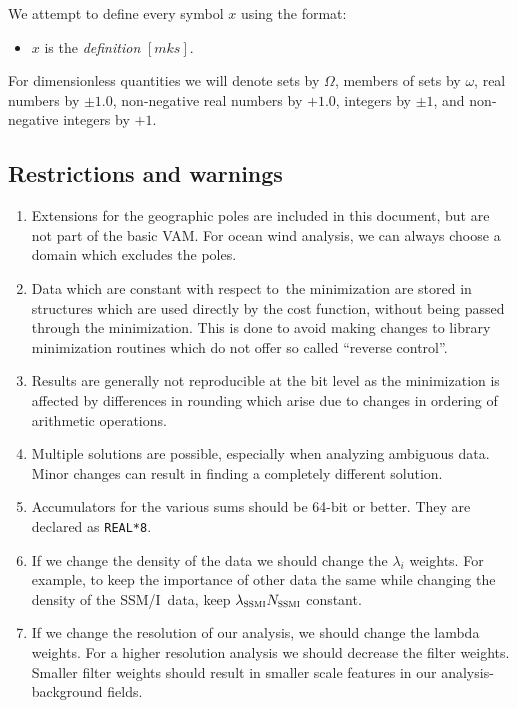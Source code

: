 \documentclass[11pt]{article}
\newcommand{\computer}[1]{{\tt #1}}
\newcommand{\glm}[1]{\mbox{$ \lambda_{\mbox{\tiny #1}} $}}
\newcommand{\gl}[1]{\mbox{$ \lambda_{#1} $}}
\newcommand{\ssmi}{SSM/I}
\newcommand{\wrt}{with respect to}
\newcommand{\xxx}[1]{\subsection {#1}}
\newcommand{\vardef}[3]{\item $ {#1} $ is the {#2} $ [{#3}] $. }
\newcommand{\subsc}[2]{\mbox{$ #1_{\mbox{\sc \footnotesize #2}} $}}
\renewcommand{\glm}[1]{\subsc{\lambda}{{#1}}}
\begin{document}
 We attempt to define every symbol $x$ using the format:
 \begin{itemize}
  \vardef{x}{\em definition}{mks}
 \end{itemize} 
 For dimensionless quantities we will denote sets by $\Omega$, members
of sets by $\omega$, real numbers by $\pm 1.0$, non-negative real
numbers by $+ 1.0$, integers by $\pm 1$, and non-negative integers by
$+1$.

\xxx {Restrictions and warnings}

 \begin{enumerate}

\item Extensions for the geographic poles are included in this
document, but are not part of the basic VAM.  For ocean wind analysis,
we can always choose a domain which excludes the poles.

\item Data which are constant \wrt\ the minimization are stored in
structures which are used directly by the cost function, without being
passed through the minimization.  This is done to avoid making changes
to library minimization routines which do not offer so called
``reverse control''.

\item Results are generally not reproducible at the bit level as the
minimization is affected by differences in rounding which arise due to
changes in ordering of arithmetic operations.

\item Multiple solutions are possible, especially when analyzing
ambiguous data.  Minor changes can result in finding a completely
different solution.

\item Accumulators for the various sums should be 64-bit or better.  They
are declared as \computer{REAL*8}.

\item If we change the density of the data we should change the \gl{i}
weights.  For example, to keep the importance of other data the same
while changing the density of the \ssmi\ data, keep $ \glm{ssmi}
\subsc{N}{ssmi} $ constant.

\item If we change the resolution of our analysis, we should change the
lambda weights.  For a higher resolution analysis we should decrease
the filter weights.  Smaller filter weights should result in smaller
scale features in our analysis-background fields.


\end{enumerate}
\end{document}

